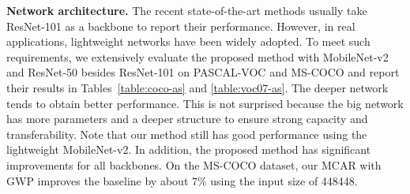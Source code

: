 \documentclass[journal]{IEEEtran}
\begin{document}
\noindent \textbf{Network architecture.} The recent state-of-the-art methods usually take ResNet-101 as a backbone to report their performance. However, in real applications, lightweight networks have been widely adopted. To meet such requirements, we extensively evaluate the proposed method with MobileNet-v2 and ResNet-50 besides ResNet-101 on PASCAL-VOC and MS-COCO and report their results in Tables~\ref{table:coco-as} and \ref{table:voc07-as}. The deeper network tends to obtain better performance. This is not surprised because the big network has more parameters and a deeper structure to ensure strong capacity and transferability. Note that our method still has good performance using the lightweight MobileNet-v2. In addition, the proposed method has significant improvements for all backbones. On the MS-COCO dataset, our MCAR with GWP improves the baseline by about 7\% using the input size of 448448.  
\end{document}
